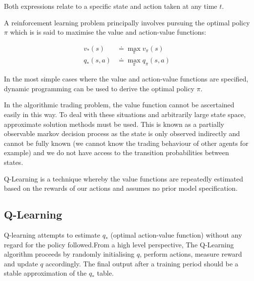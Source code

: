 \documentclass[12pt]{article}
\begin{document}
Both expressions relate to a specific state and action taken at any time $t$.

A reinforcement learning problem principally involves pursuing the optimal policy $\pi$ which is is said to maximise the value and action-value functions:

$$
\begin{aligned}
v _ { * } ( s ) &\doteq \max _ { \pi } v _ { \pi } ( s )\\
q _ { * } ( s , a ) &\doteq \max _ { \pi } q _ { \pi } ( s , a )
\end{aligned}
$$

In the most simple cases where the value and action-value functions are specified, dynamic programming can be used to derive the optimal policy $\pi$.







In the algorithmic trading problem, the value function cannot be ascertained easily in this way. To deal with these situations and arbitrarily large state space, approximate solution methods must be used. This is known as a partially observable markov decision process as the state is only observed indirectly and cannot be fully known (we cannot know the trading behaviour of other agents for example) and we do not have access to the transition probabilities between states.

Q-Learning is a technique whereby the value functions are repeatedly estimated based on the rewards of our actions and assumes no prior model specification.


\subsection{Q-Learning} 

Q-learning attempts to estimate $q_{*}$ (optimal action-value function) without any regard for the policy followed.From a high level perspective, The Q-Learning algorithm proceeds by randomly initialising $q$, perform actions, measure reward and update $q$ accordingly. The final output after a training period should be a stable approximation of the $q_{*}$ table.
\end{document}
